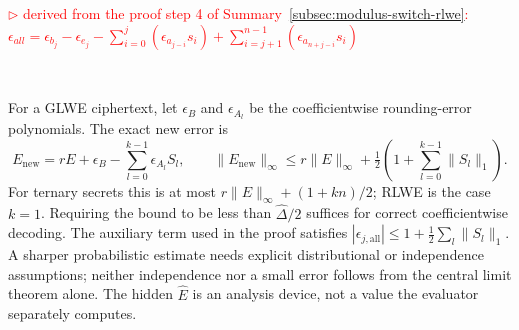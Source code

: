 \textcolor{red}{ $\rhd$ derived from the proof step 4 of Summary~\ref*{subsec:modulus-switch-rlwe}: $\epsilon_{\textit{all}} = \epsilon_{b_j} - \epsilon_{e_j}
- \sum\limits_{i=0}^{j}(\epsilon_{a_{j-i}} s_i)
+ \sum\limits_{i=j+1}^{n-1}(\epsilon_{a_{n+j-i}} s_i)$}

$ $

For a GLWE ciphertext, let $\epsilon_B$ and $\epsilon_{A_l}$ be the coefficientwise rounding-error polynomials. The exact new error is
\[
E_{\mathrm{new}}=rE+\epsilon_B-\sum_{l=0}^{k-1}\epsilon_{A_l}S_l,
\qquad
\|E_{\mathrm{new}}\|_\infty\le r\|E\|_\infty+\tfrac12\left(1+\sum_{l=0}^{k-1}\|S_l\|_1\right).
\]
For ternary secrets this is at most $r\|E\|_\infty+(1+kn)/2$; RLWE is the case $k=1$. Requiring the bound to be less than $\hat\Delta/2$ suffices for correct coefficientwise decoding. The auxiliary term used in the proof satisfies $|\epsilon_{j,\mathrm{all}}|\le1+\frac12\sum_l\|S_l\|_1$. A sharper probabilistic estimate needs explicit distributional or independence assumptions; neither independence nor a small error follows from the central limit theorem alone. The hidden $\hat E$ is an analysis device, not a value the evaluator separately computes.